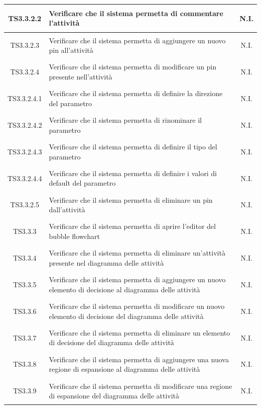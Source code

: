 \documentclass[../PianoDiQualifica.tex]{subfiles}
\begin{document}
\begin{longtable}{|c|>{\centering}p{10cm}|c|}
	\hline
	\hypertarget{TS3.3.2.2}{TS3.3.2.2} & Verificare che il sistema permetta di commentare l'attività & N.I. \\
	\hline
	\hypertarget{TS3.3.2.3}{TS3.3.2.3} & Verificare che il sistema permetta di aggiungere un nuovo pin all'attività & N.I. \\
	\hline
	\hypertarget{TS3.3.2.4}{TS3.3.2.4} & Verificare che il sistema permetta di modificare un pin presente nell'attività & N.I. \\
	\hline
	\hypertarget{TS3.3.2.4.1}{TS3.3.2.4.1} & Verificare che il sistema permetta di definire la direzione del parametro & N.I. \\
	\hline
	\hypertarget{TS3.3.2.4.2}{TS3.3.2.4.2} & Verificare che il sistema permetta di rinominare il parametro & N.I. \\
	\hline
	\hypertarget{TS3.3.2.4.3}{TS3.3.2.4.3} & Verificare che il sistema permetta di definire il tipo del parametro & N.I. \\
	\hline
	\hypertarget{TS3.3.2.4.4}{TS3.3.2.4.4} & Verificare che il sistema permetta di definire i valori di default del parametro & N.I. \\
	\hline
	\hypertarget{TS3.3.2.5}{TS3.3.2.5} & Verificare che il sistema permetta di eliminare un pin dall'attività & N.I. \\
	\hline
	\hypertarget{TS3.3.3}{TS3.3.3} & Verificare che il sistema permetta di aprire l'editor del bubble flowchart & N.I. \\
	\hline
	\hypertarget{TS3.3.4}{TS3.3.4} & Verificare che il sistema permetta di eliminare un'attività presente nel diagramma delle attività & N.I. \\
	\hline
	\hypertarget{TS3.3.5}{TS3.3.5} & Verificare che il sistema permetta di aggiungere un nuovo elemento di decisione al diagramma delle attività & N.I. \\
	\hline
	\hypertarget{TS3.3.6}{TS3.3.6} & Verificare che il sistema permetta di modificare un nuovo elemento di decisione del diagramma delle attività & N.I. \\
	\hline
	\hypertarget{TS3.3.7}{TS3.3.7} & Verificare che il sistema permetta di eliminare un elemento di decisione del diagramma delle attività & N.I. \\
	\hline
	\hypertarget{TS3.3.8}{TS3.3.8} & Verificare che il sistema permetta di aggiungere una nuova regione di espansione al diagramma delle attività & N.I. \\
	\hline
	\hypertarget{TS3.3.9}{TS3.3.9} & Verificare che il sistema permetta di modificare una regione di espansione del diagramma delle attività & N.I. \\

\end{longtable}
\end{document}
